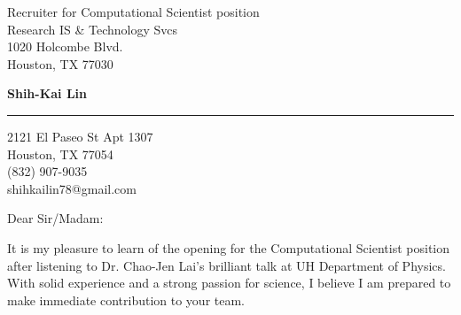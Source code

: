 \documentclass{letter} %
\begin{document}
\signature{Shih-Kai Lin}           %
\longindentation=0pt                       %
\let\raggedleft\raggedright                %
 
 
\begin{letter}{Recruiter for Computational Scientist position \\
Research IS \& Technology Svcs \\
1020 Holcombe Blvd. \\
Houston, TX 77030}

\begin{center}
{\large\bf Shih-Kai Lin} 
\end{center}
\medskip\hrule height 1pt
\begin{center}
{2121 El Paseo St Apt 1307 \\   Houston, TX 77054 \\ (832) 907-9035 \\ shihkailin78@gmail.com} 
\end{center} \vfill %
 
 
\opening{Dear Sir/Madam:} 
 
\noindent %
It is my pleasure to learn of the opening for the Computational Scientist position after listening to Dr. Chao-Jen Lai's brilliant talk at UH Department of Physics. With solid experience and a strong passion for science, I believe I am prepared to make immediate contribution to your team.
 

\end{letter}
\end{document}
